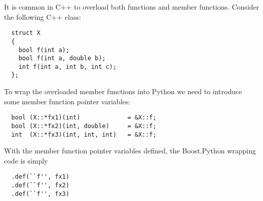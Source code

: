 It is common in C++ to overload both functions and member functions. Consider the following C++ class:
\begin{verbatim}
  struct X
  {
    bool f(int a);
    bool f(int a, double b);
    int f(int a, int b, int c);
  };
\end{verbatim} 
To wrap the overloaded member functions into Python we need to introduce some member function pointer variables:
\begin{verbatim}
  bool (X::*fx1)(int)             = &X::f;
  bool (X::*fx2)(int, double)     = &X::f;
  int  (X::*fx3)(int, int, int)   = &X::f;
\end{verbatim}
With the member function pointer variables defined, the Boost.Python wrapping code is simply
\begin{verbatim}
  .def(``f'', fx1)
  .def(``f'', fx2)
  .def(``f'', fx3)
\end{verbatim}

